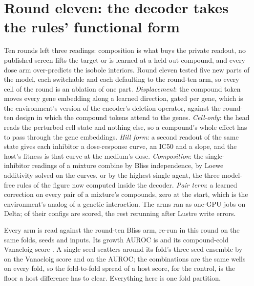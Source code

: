 
\clearpage
\section{Round eleven: the decoder takes the rules' functional form}
\label{sec:round11}

 Ten rounds left three readings: composition is what buys
the private readout, no published screen lifts the target or is learned at a held-out
compound, and every dose arm over-predicts the isobole interiors. Round eleven tested five
new parts of the model, each switchable and each defaulting to the round-ten arm, so every
cell of the round is an ablation of one part. \emph{Displacement}: the compound token
moves every gene embedding along a learned direction, gated per gene, which is the
environment's version of the encoder's deletion operator, against the round-ten design in
which the compound tokens attend to the genes. \emph{Cell-only}: the head reads the
perturbed cell state and nothing else, so a compound's whole effect has to pass through
the gene embeddings. \emph{Hill form}: a second readout of the same state gives each
inhibitor a dose-response curve, an IC50 and a slope, and the host's fitness is that curve
at the medium's dose. \emph{Composition}: the single-inhibitor readings of a mixture
combine by Bliss independence, by Loewe additivity solved on the curves, or by the highest
single agent, the three model-free rules of the figure now computed inside the decoder.
\emph{Pair term}: a learned correction on every pair of a mixture's compounds, zero at
the start, which is the environment's analog of a genetic interaction. The \rElevennArms{}
arms ran as \rElevennJobs{} one-GPU jobs on Delta; \rElevennScored{} of their
\rElevennConfigs{} configs are scored, the rest rerunning after Lustre write errors.

 Every arm is read against the round-ten Bliss arm,
re-run in this round on the same folds, seeds and inputs. Its growth AUROC is
\rElevencontrolAuroc{} and its compound-cold Vanacloig score \rElevencontrolVan{}. A
single seed scatters around its fold's three-seed ensemble by \rElevenseedSdVan{} on the
Vanacloig score and \rElevenseedSdAuroc{} on the AUROC; the \hydnCombinations{}
combinations are the same wells on every fold, so the fold-to-fold spread of a host score,
\rElevencontrolFoldSd{} for the control, is the floor a host difference has to clear.
Everything here is one fold partition.

